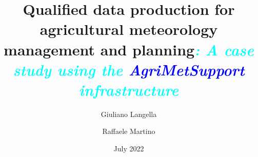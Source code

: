 \documentclass[authoryear,preprint,review,12pt]{elsarticle}
\newcommand{\note}[1]{\emph{\textcolor{red}{#1}}}
\newcommand{\update}[1]{\emph{\textcolor{blue}{#1}}}
\newcommand{\review}[1]{\emph{\textcolor{cyan}{#1}}}
\newcommand{\gci}{\update{AgriMetSupport}\xspace}
\begin{document}
\begin{frontmatter}



\title{ Qualified data production for agricultural meteorology management and planning\review{: A case study using the \gci infrastructure} }


\author[dia,crisp]{Giuliano Langella}
\address[dia]{Department of Agriculture, University of Naples Federico II, Via Università 100, 80055 Portici, NA, Italy}
\address[crisp]{Interdepartmental Centre on Earth Critical Zone, University of Naples Federico II, Via Università 100, 80055 Portici, NA, Italy}

\author[deeit]{Raffaele Martino}
\address[deeit]{Department of Electrical Engineering and Information Technology, University of Naples Federico II, Via Claudio 21, 80125 Naples, NA, Italy}

\date{July 2022}

\begin{abstract}


\end{abstract}
\end{frontmatter}
\end{document}
